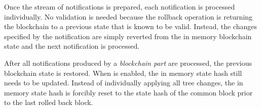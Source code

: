 Once the stream of notifications is prepared, each notification is processed individually.
No validation is needed because the rollback operation is returning the blockchain to a previous state that is known to be valid.
Instead, the changes specified by the notification are simply reverted from the in memory blockchain state and the next notification is processed.

After all notifications produced by a \emph{blockchain part} are processed, the previous blockchain state is restored.
When  is enabled, the in memory state hash still needs to be updated.
Instead of individually applying all tree changes, the in memory state hash is forcibly reset to the state hash of the common block prior to the last rolled back block.
